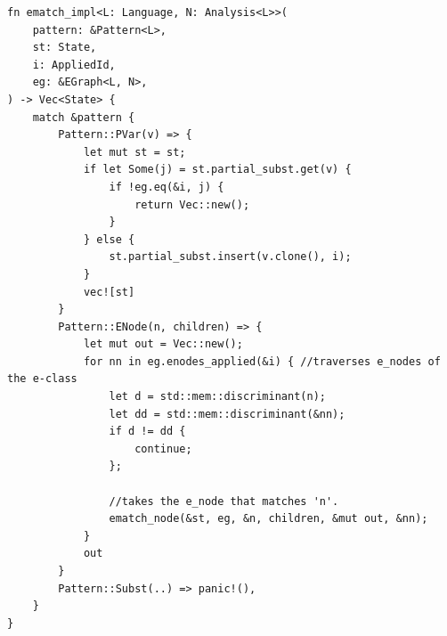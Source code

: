 \documentclass[acmsmall,screen, nonacm, anonymous]{acmart}
\begin{document}
\begin{listing}
\begin{verbatim}
fn ematch_impl<L: Language, N: Analysis<L>>(
    pattern: &Pattern<L>,
    st: State,
    i: AppliedId,
    eg: &EGraph<L, N>,
) -> Vec<State> {
    match &pattern {
        Pattern::PVar(v) => {
            let mut st = st;
            if let Some(j) = st.partial_subst.get(v) {
                if !eg.eq(&i, j) {
                    return Vec::new();
                }
            } else {
                st.partial_subst.insert(v.clone(), i);
            }
            vec![st]
        }
        Pattern::ENode(n, children) => {
            let mut out = Vec::new();
            for nn in eg.enodes_applied(&i) { //traverses e_nodes of the e-class
                let d = std::mem::discriminant(n);
                let dd = std::mem::discriminant(&nn);
                if d != dd {
                    continue;
                };

                //takes the e_node that matches 'n'.
                ematch_node(&st, eg, &n, children, &mut out, &nn);
            }
            out
        }
        Pattern::Subst(..) => panic!(),
    }
}

\end{verbatim}
\end{listing}
\end{document}

